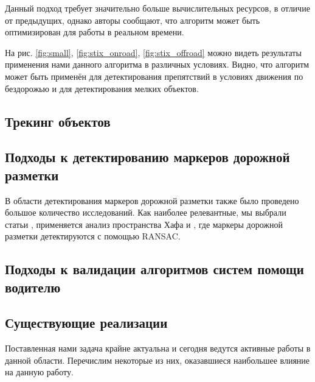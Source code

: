 \documentclass[aps,%
14pt,%
final,%
oneside,
onecolumn,%
musixtex, %
superscriptaddress,%
centertags]{extarticle} %
\begin{document}
Данный подход требует значительно больше вычислительных ресурсов, в отличие от предыдущих, однако авторы \cite{benenson2011stixels} сообщают, что алгоритм может быть оптимизирован для работы в реальном времени.

На рис. \ref{fig:small}, \ref{fig:stix_onroad}, \ref{fig:stix_offroad} можно видеть результаты применения нами данного алгоритма в различных условиях. Видно, что алгоритм может быть применён для детектирования препятствий в условиях движения по бездорожью и для детектирования мелких объектов.

\subsection{Трекинг объектов}

\subsection{Подходы к детектированию маркеров дорожной разметки}

В области детектирования маркеров дорожной разметки также было проведено большое количество исследований. Как наиболее релевантные, мы выбрали статьи \cite{song2017real}, применяется анализ пространства Хафа и \cite{aly2008real}, где маркеры дорожной разметки детектируются с помощью RANSAC. 


\subsection{Подходы к валидации алгоритмов систем помощи водителю}

\subsection{Существующие реализации}










Поставленная нами задача крайне актуальна и сегодня ведутся активные работы в данной области. Перечислим некоторые из них, оказавшиеся наибольшее влияние на данную работу.
\end{document}

